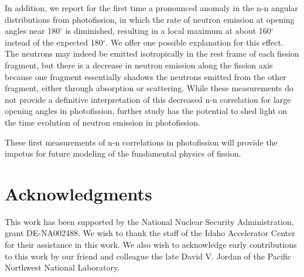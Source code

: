 \documentclass[%
 reprint,
 amsmath,amssymb,
 aps,
 nofootinbib
]{revtex4-1}
\begin{document}
In addition, we report for the first time a pronounced anomaly in the n-n angular distributions from photofission, in which the rate of neutron emission at opening angles near 180$^{\circ}$ is diminished, resulting in a local maximum at about 160$^{\circ}$ instead of the expected 180$^{\circ}$.
We offer one possible explanation for this effect. %
The neutrons may indeed be emitted isotropically in the rest frame of each fission fragment, but there is a decrease in neutron emission along the fission axis because one fragment essentially shadows the neutrons emitted from the other fragment, either through absorption or scattering.
While these measurements do not provide a definitive interpretation of this decreased n-n correlation for large opening angles in photofission, further study has the potential to shed light on the time evolution of neutron emission in photofission.

These first measurements of n-n correlations in photofission will provide the impetus for future modeling of the fundamental physics of fission.

\section{Acknowledgments}
This work has been supported by the National Nuclear Security Administration, grant DE-NA002488. We wish to thank the staff of the Idaho Accelerator Center for their assistance in this work. We also wish to acknowledge early contributions to this work by our friend and colleague the late David V. Jordan of the Pacific Northwest National Laboratory. 

%

\end{document}
